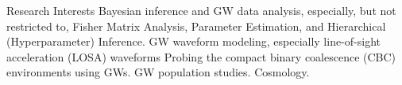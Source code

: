 
\begin{rubric}{Research Interests}
\entry*[] Bayesian inference and GW data analysis, especially, but not restricted to, Fisher Matrix Analysis, Parameter Estimation, and Hierarchical (Hyperparameter) Inference.
\entry*[] GW waveform modeling, especially line-of-sight acceleration (LOSA) waveforms
\entry*[] Probing the compact binary coalescence (CBC) environments using GWs. 
\entry*[] GW population studies.
\entry*[] Cosmology.
    
\end{rubric}
